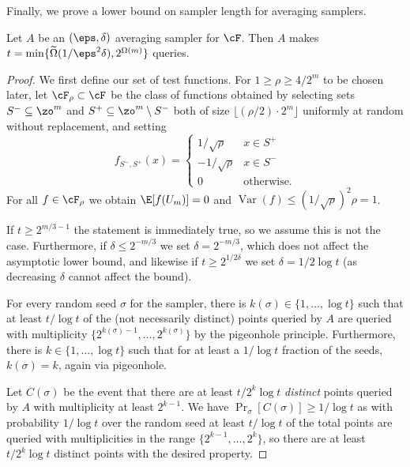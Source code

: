 \documentclass{toc}
\begin{document}
Finally, we prove a lower bound on sampler length for averaging samplers. %
\begin{proposition}
Let $A$ be an $(\eps,\delta)$ averaging sampler for $\cF$. Then $A$ makes $t=\min\{\widetilde{\Omega}(1/\eps^2\delta),2^{\Omega(m)}\}$ queries.
\end{proposition}
\begin{proof}
We first define our set of test functions. For $1\geq \rho\geq 4/2^{m}$ to be chosen later, let $\cF_\rho\subset \cF$ be the class of functions obtained by selecting sets $S^-\subseteq \zo^m$ and $S^+\subseteq \zo^m\setminus S^-$ both of size $\lfloor (\rho/2)\cdot 2^m\rfloor$ uniformly at random without replacement, and setting
\[f_{S^-,S^+}(x) = \begin{cases}
1/\sqrt{\rho} & x\in S^+\\
-1/\sqrt{\rho} & x \in S^-\\
0 & \text{otherwise.}\end{cases}\]
For all $f\in \cF_\rho$ we obtain $\E[f(U_m)]=0$ and $\operatorname{Var}(f) \leq  (1/\sqrt{\rho})^2\rho=1$.


If $t\geq 2^{m/3-1}$ the statement is immediately true, so we assume this is not the case. Furthermore, if $\delta \leq 2^{-m/3}$ we set $\delta=2^{-m/3}$, which does not affect the asymptotic lower bound, and likewise if $t\geq 2^{1/2\delta}$ we set $\delta=1/2\log t$ (as decreasing $\delta$ cannot affect the bound).

For every random seed $\sigma$ for the sampler, there is $k(\sigma)\in \{1,\ldots,\log t\}$ such that at least $t/\log t$ of the (not necessarily distinct) points queried by $A$ are queried with multiplicity $\{2^{k(\sigma)-1},\ldots,2^{k(\sigma)}\}$ by the pigeonhole principle. Furthermore, there is $k\in \{1,\ldots,\log t\}$ such that for at least a $1/\log t$ fraction of the seeds, $k(\sigma)=k$, again via pigeonhole. 

Let $C(\sigma)$ be the event that there are at least $t/2^k\log t$ \textit{distinct} points queried by $A$ with multiplicity at least $2^{k-1}$. We have $\Pr_\sigma[C(\sigma)]\geq 1/\log t$ as with probability $1/\log t$ over the random seed at least $t/\log t$ of the total points are queried with multiplicities in the range $\{2^{k-1},\ldots,2^k\}$, so there are at least $t/2^{k}\log t$ distinct points with the desired property.


\end{proof}
\end{document}
